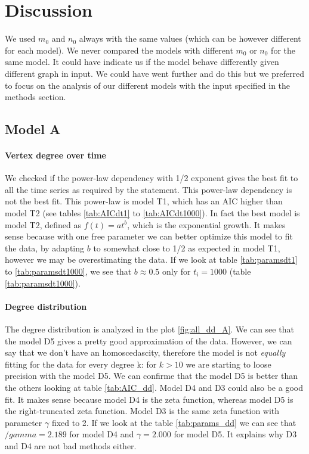 \documentclass[a4paper]{article}
\begin{document}
\section{Discussion}

We used $m_0$ and $n_0$ always with the same values (which can be however
different for each model). We never compared the models with different $m_0$ or
$n_0$ for the same model. It could have indicate us if the model behave
differently given different graph in input. We could have went further and do
this but we preferred to focus on the analysis of our different models with the
input specified in the methods section.

\subsection{Model A}


\paragraph{Vertex degree over time}

We checked if the power-law dependency with 1/2 exponent gives the best fit to
all the time series as required by the statement. This power-law dependency is
not the best fit. This power-law is model T1, which has an AIC higher than model
T2 (see tables \ref{tab:AICdt1} to \ref{tab:AICdt1000}). In fact the best model
is model T2, defined as $f(t) = at^b$, which is the exponential growth. It makes
sense because with one free parameter we can better optimize this model to fit
the data, by adapting $b$ to somewhat close to 1/2 as expected in model T1,
however we may be overestimating the data.
%
If we look at table \ref{tab:paramsdt1} to \ref{tab:paramsdt1000}, we
see that $b \approx 0.5$ only for $t_i = 1000$ (table \ref{tab:paramsdt1000}).

\paragraph{Degree distribution}

The degree distribution is analyzed in the plot \ref{fig:all_dd_A}. We can see
that the model D5 gives a pretty good approximation of the data. However, we
can say that we don't have an homoscedascity, therefore the model is not
\textit{equally} fitting for the data for every degree k: for $k > 10$ we are
starting to loose precision with the model D5. We can confirme that the model D5
is better than the others looking at table \ref{tab:AIC_dd}. Model D4 and D3
could also be a good fit. It makes sense because model D4 is the zeta function,
whereas model D5 is the right-truncated zeta function. Model D3 is the same zeta
function with parameter $\gamma$ fixed to 2. If we look at the table
\ref{tab:params_dd} we can see that $/gamma = 2.189$ for model D4 and
$\gamma = 2.000$ for model D5. It explains why D3 and D4 are not bad methods
either.
\end{document}
